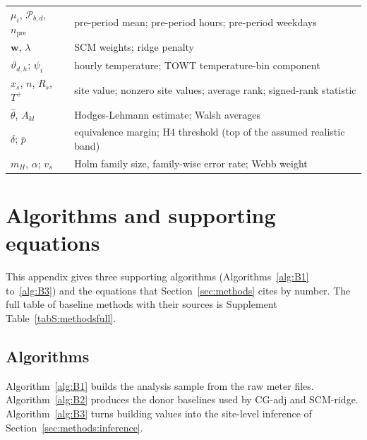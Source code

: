 \begin{longtable}{@{}>{\raggedright\arraybackslash}p{}>{\raggedright\arraybackslash}p{}@{}}
$\mu_i$, $\mathcal{P}_{b,d}$, $n_{\mathrm{pre}}$ & pre-period mean; pre-period hours; pre-period weekdays \\
$\mathbf{w}$, $\lambda$ & SCM weights; ridge penalty \\
$\vartheta_{d,h}$; $\psi_i$ & hourly temperature; TOWT temperature-bin component \\
$x_s$, $n$, $R_s$, $T^{+}$ & site value; nonzero site values; average rank; signed-rank statistic \\*
$\hat\theta$, $A_{kl}$ & Hodges-Lehmann estimate; Walsh averages \\*
$\delta$; $\bar{p}$ & equivalence margin; H4 threshold (top of the assumed realistic band) \\*
$m_H$, $\alpha$; $v_s$ & Holm family size, family-wise error rate; Webb weight \\
\end{longtable}

\section{Algorithms and supporting equations}\label{app:details}

\setcounter{equation}{0}
\renewcommand{\theequation}{B.\arabic{equation}}
\setcounter{algocf}{0}
\renewcommand{\thealgocf}{B.\arabic{algocf}}

This appendix gives three supporting algorithms (Algorithms~\ref{alg:B1} to~\ref{alg:B3}) and the equations that Section~\ref{sec:methods} cites by number. The full table of baseline methods with their sources is Supplement Table~\ref{tabS:methodsfull}.

\subsection{Algorithms}\label{app:algorithms}

Algorithm~\ref{alg:B1} builds the analysis sample from the raw meter files. Algorithm~\ref{alg:B2} produces the donor baselines used by CG-adj and SCM-ridge. Algorithm~\ref{alg:B3} turns building values into the site-level inference of Section~\ref{sec:methods:inference}.

